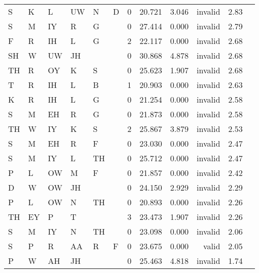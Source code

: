 \begin{longtable}{l@{ } l@{ } l@{ } l@{ } l@{ } l r r r r r r}
S  & K  & L  & UW & N  & D &  0 & 20.721 & 3.046 & invalid & 2.83 \\
S  & M  & IY & R  & G  &   &  0 & 27.414 & 0.000 & invalid & 2.79 \\
F  & R  & IH & L  & G  &   &  2 & 22.117 & 0.000 & invalid & 2.68 \\
SH & W  & UW & JH &    &   &  0 & 30.868 & 4.878 & invalid & 2.68 \\
TH & R  & OY & K  & S  &   &  0 & 25.623 & 1.907 & invalid & 2.68 \\
T  & R  & IH & L  & B  &   &  1 & 20.903 & 0.000 & invalid & 2.63 \\
K  & R  & IH & L  & G  &   &  0 & 21.254 & 0.000 & invalid & 2.58 \\
S  & M  & EH & R  & G  &   &  0 & 21.873 & 0.000 & invalid & 2.58 \\
TH & W  & IY & K  & S  &   &  2 & 25.867 & 3.879 & invalid & 2.53 \\
S  & M  & EH & R  & F  &   &  0 & 23.030 & 0.000 & invalid & 2.47 \\
S  & M  & IY & L  & TH &   &  0 & 25.712 & 0.000 & invalid & 2.47 \\
P  & L  & OW & M  & F  &   &  0 & 21.857 & 0.000 & invalid & 2.42 \\
D  & W  & OW & JH &    &   &  0 & 24.150 & 2.929 & invalid & 2.29 \\
P  & L  & OW & N  & TH &   &  0 & 20.893 & 0.000 & invalid & 2.26 \\
TH & EY & P  & T  &    &   &  3 & 23.473 & 1.907 & invalid & 2.26 \\
S  & M  & IY & N  & TH &   &  0 & 23.098 & 0.000 & invalid & 2.06 \\
S  & P  & R  & AA & R  & F &  0 & 23.675 & 0.000 & valid   & 2.05 \\
P  & W  & AH & JH &    &   &  0 & 25.463 & 4.818 & invalid & 1.74 \\
\bottomrule
\end{longtable}
